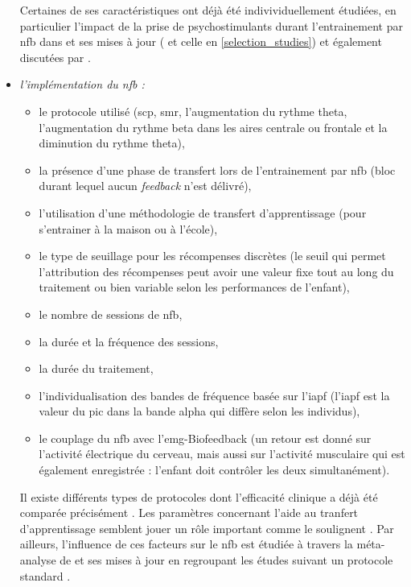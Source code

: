\begin{itemize}
Certaines de ses caractéristiques ont déjà été indivividuellement étudiées, en particulier l'impact de la prise de psychostimulants durant l'entrainement par \gls{nfb} dans
\citet{Cortese2016} et ses mises à jour (\citep{Bussalb2019clinical} et celle en \ref{selection_studies}) et également discutées par \citet{VanDoren2017}.
\item \emph{l'implémentation du \gls{nfb} :} 
    \begin{itemize}
    \item le protocole utilisé (\gls{scp}, \gls{smr}, l'augmentation du rythme theta, l'augmentation du rythme beta dans les aires centrale ou frontale 
    et la diminution du rythme theta), 
		\item la présence d'une phase de transfert lors de l'entrainement par \gls{nfb} (bloc durant lequel aucun \textit{feedback} n'est délivré), 
		\item l'utilisation d'une méthodologie de transfert d'apprentissage (pour s'entrainer à la maison ou à l'école), 
    \item le type de seuillage pour les récompenses discrètes (le seuil qui permet l'attribution des récompenses peut avoir une valeur fixe tout au long du traitement ou bien variable
		selon les performances de l'enfant), 
		\item le nombre de sessions de \gls{nfb}, 
		\item la durée et la fréquence des sessions, 
		\item la durée du traitement, 
		\item l'individualisation des bandes de fréquence basée sur l'\gls{iapf} (l'\gls{iapf} est la valeur du pic dans la bande alpha qui diffère selon les individus), 
		\item le couplage du \gls{nfb} avec l'\gls{emg}-Biofeedback (un retour est donné sur l'activité électrique du cerveau, mais aussi sur l'activité musculaire qui est 
		également enregistrée : l'enfant doit
		contrôler les deux simultanément).
		\end{itemize}
Il existe différents types de protocoles dont l'efficacité clinique a déjà été comparée précisément
\citep{Leins2007}. Les paramètres concernant l'aide au tranfert d'apprentissage semblent jouer un rôle important comme le soulignent \citet{Arns2014, Gani2008, Strehl2006}.
Par ailleurs, l'influence de ces facteurs sur le \gls{nfb} est étudiée à travers la méta-analyse de \citet{Cortese2016} et ses mises à jour en regroupant les études suivant un protocole standard
\citep{Arns2014}.


\end{itemize}
